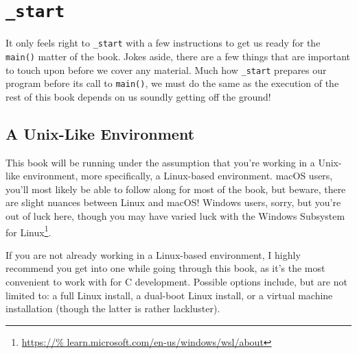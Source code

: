 %

\chapter{\texttt{\_start}}

It only feels right to \texttt{_start} with a few instructions to
get us ready for the \texttt{main()} matter of the book.  Jokes
aside, there are a few things that are important to touch upon before we
cover any material.  Much how \texttt{_start} prepares our
program before its call to \texttt{main()}, we must do the same
as the execution of the rest of this book depends on us soundly getting
off the ground!

\section{A Unix-Like Environment}

This book will be running under the assumption that you're working in a
Unix-like environment, more specifically, a Linux-based environment.
macOS users, you'll most likely be able to follow along for most of the
book, but beware, there are slight nuances between Linux and macOS!
Windows users, sorry, but you're out of luck here, though you may have
varied luck with the Windows Subsystem for Linux\footnote{\url{https://%
learn.microsoft.com/en-us/windows/wsl/about}}.

If you are not already working in a Linux-based environment, I highly
recommend you get into one while going through this book, as it's the
most convenient to work with for C development.  Possible options
include, but are not limited to: a full Linux install, a dual-boot Linux
install, or a virtual machine installation (though the latter is rather
lackluster).
